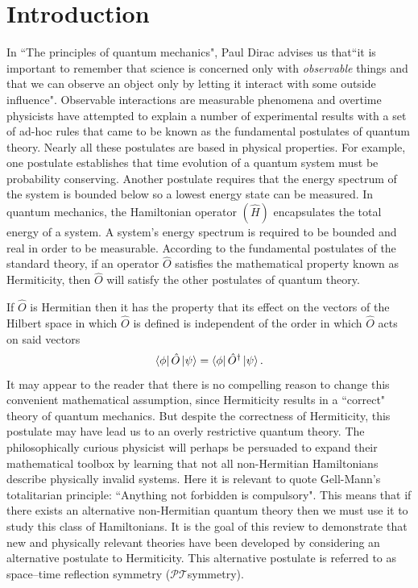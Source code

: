 \documentclass[12pt, a4paper]{report}
\newcommand\PT{\(\mathcal{PT}\)}
\begin{document}
\chapter{Introduction}\label{Introduction}
In ``The principles of quantum mechanics", Paul Dirac advises us that``it is important to remember that science is concerned only with \textit{observable} things and that we can observe an object only by letting it interact with some outside influence"\cite{POQM}. Observable interactions are measurable phenomena and overtime physicists have attempted to explain a number of experimental results with a set of ad-hoc rules that came to be known as the fundamental postulates of quantum theory. Nearly all these postulates are based in physical properties. For example, one postulate establishes that time evolution of a quantum system must be probability conserving. Another postulate requires that the energy spectrum of the system is bounded below so a lowest energy state can be measured. In quantum mechanics, the Hamiltonian operator $(\hat{H})$ encapsulates the total energy of a system. A system's energy spectrum is required to be bounded and real in order to be measurable. According to the fundamental postulates of the standard theory, if an operator $\hat{O}$ satisfies the mathematical property known as Hermiticity, then $\hat{O}$ will satisfy the other postulates of quantum theory.

If $\hat{O}$ is Hermitian then it has the property that its effect on the vectors of the Hilbert space in which $\hat{O}$ is defined is independent of the order in which $\hat{O}$ acts on said vectors\cite{Jones-Smith}
\begin{equation}\label{eq:1.1}
\bra{\phi}\hat{O}\ket{\psi} = \bra{\phi}\hat{O}^{\dagger}\ket{\psi}.
\end{equation}
It may appear to the reader that there is no compelling reason to change this convenient mathematical assumption, since Hermiticity results in a ``correct" theory of quantum mechanics. But despite the correctness of Hermiticity, this postulate may have lead us to an overly restrictive quantum theory. The philosophically curious physicist will perhaps be persuaded to expand their mathematical toolbox by learning that not all non-Hermitian Hamiltonians describe physically invalid systems. Here it is relevant to quote Gell-Mann's totalitarian principle: ``Anything not forbidden is compulsory". This means that if there exists an alternative non-Hermitian quantum theory then we must use it to study this class of Hamiltonians.
It is the goal of this review to demonstrate that new and physically relevant theories have been developed by considering an alternative postulate to Hermiticity. This alternative postulate is referred to as space–time reflection symmetry (\PT\:symmetry)\cite{MustaHbeHermitian}. 
\end{document}
